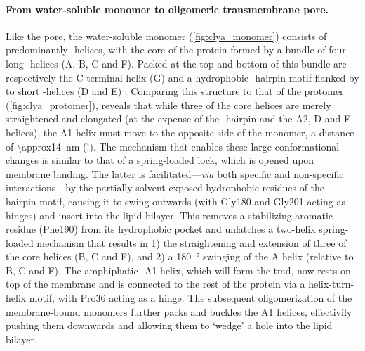 \paragraph{From water-soluble monomer to oligomeric transmembrane pore.}
%
Like the pore, the water-soluble monomer (\cref{fig:clya_monomer}) consists of predominantly \ta-helices, with
the core of the protein formed by a bundle of four long \ta-helices (\ta A, \ta B, \ta C and \ta F). Packed at
the top and bottom of this bundle are respectively the C-terminal helix (\ta G) and a hydrophobic \tb-hairpin
motif flanked by to short \ta-helices (\ta D and \ta E) \cite{Wallace-2000,Mueller-2009}. Comparing this
structure to that of the protomer (\cref{fig:clya_protomer}), reveals that while three of the core helices are
merely straightened and elongated (at the expense of the \tb-hairpin and the \ta A2, \ta D and \ta E helices),
the \ta A1 helix must move to the opposite side of the monomer, a distance of \SI{\approx14}{\nm} (!). The
mechanism that enables these large conformational changes is similar to that of a spring-loaded lock, which is
opened upon membrane binding. The latter is facilitated---\textit{via} both specific and non-specific
interactions---by the partially solvent-exposed hydrophobic residues of the \tb-hairpin motif, causing it to
swing outwards (with Gly180 and Gly201 acting as hinges) and insert into the lipid bilayer.  This removes a
stabilizing aromatic residue (Phe190) from its hydrophobic pocket and unlatches a two-helix spring-loaded
mechanism that results in 1) the straightening and extension of three of the core helices (\ta B, \ta C and
\ta F), and 2) a \SI{180}{\degree} swinging of the \ta A helix (relative to \ta B, \ta C and \ta F). The
amphiphatic \ta-A1 helix, which will form the \gls{tmd}, now rests on top of the membrane and is connected to
the rest of the protein via a helix-turn-helix motif, with Pro36 acting as a hinge. The subsequent
oligomerization of the membrane-bound monomers further packs and buckles the \ta A1 helices, effectivily
pushing them downwards and allowing them to `wedge' a hole into the lipid bilayer.

